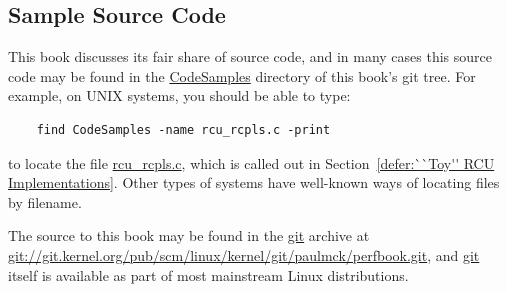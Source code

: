 \subsection{Sample Source Code}

This book discusses its fair share of source code, and in many cases
this source code may be found in the \url{CodeSamples} directory
of this book's git tree.
For example, on UNIX systems, you should be able to type:
\begin{verbatim}
	find CodeSamples -name rcu_rcpls.c -print
\end{verbatim}
to locate the file \url{rcu_rcpls.c}, which is called out in
Section~\ref{defer:``Toy'' RCU Implementations}.
Other types of systems have well-known ways of locating files by
filename.

The source to this book may be found in the \url{git} archive at
\url{git://git.kernel.org/pub/scm/linux/kernel/git/paulmck/perfbook.git},
and \url{git} itself is available as part of most mainstream Linux
distributions.
